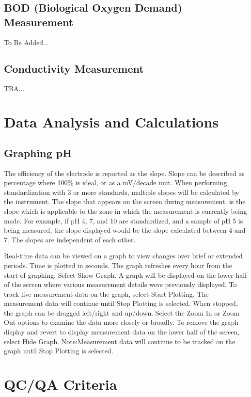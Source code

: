 \documentclass[12pt]{../SOP3}\usepackage[]{graphicx}\usepackage[]{color}
\begin{document}
\subsection{BOD (Biological Oxygen Demand) Measurement}
\NP To Be Added...

\subsection{Conductivity Measurement}
\NP TBA...


\section{Data Analysis and Calculations}

\subsection{Graphing pH}
\NP The efficiency of the electrode is reported as the slope. Slope can be described as percentage where 100\% is ideal, or as a mV/decade unit. When performing  standardization with 3 or more standards, multiple slopes will be calculated by the  instrument. The slope that appears on the screen during measurement, is the slope which is applicable to the zone in which the measurement is currently being made. For example, if pH 4, 7, and 10 are standardized, and a sample of pH 5 is being measured, the slope displayed would be the slope calculated between 4 and 7. The slopes are independent of each other. 

\NP Real-time data can be viewed on a graph to view changes over brief or  extended  periods. Time  is  plotted  in  seconds. The  graph  refreshes  every  hour  from  the  start of graphing.
\NP Select Show Graph. A graph will be displayed on the lower half of the screen where various measurement details were previously displayed.  
\NP To track live measurement data on the graph, select 
Start Plotting. The measurement data will continue until 
Stop Plotting is selected. When stopped, the graph can be dragged left/right and up/down.
\NP Select the Zoom In or Zoom Out options to examine the data more closely or broadly.
\NP To remove the graph display and revert to display measurement data on the lower half of the screen, select Hide Graph. Note:Measurement  data  will  continue  to  be  tracked  on  the  graph  until  Stop  Plotting is  selected.  

\section{QC/QA Criteria}
\end{document}
